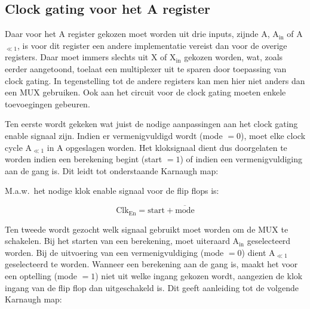 \subsection{Clock gating voor het A register}


Daar voor het A register gekozen moet worden uit drie  inputs, zijnde A, A$_{\text{in}}$ of A$_{\ll 1}$, is voor dit register een andere implementatie vereist dan voor de overige registers. Daar moet immers slechts uit X of X$_{\text{in}}$ gekozen worden, wat, zoals eerder aangetoond, toelaat een multiplexer uit te sparen door toepassing van clock gating. In tegenstelling tot de andere registers kan men hier niet anders dan een MUX gebruiken. Ook aan het circuit voor de clock gating moeten enkele toevoegingen gebeuren.

Ten eerste wordt gekeken wat juist de nodige aanpassingen aan het clock gating enable signaal zijn. Indien er vermenigvuldigd wordt (mode $= 0$), moet elke clock cycle A$_{\ll 1}$ in A opgeslagen worden. Het kloksignaal dient dus doorgelaten te worden indien een berekening begint (start $= 1$) of indien een vermenigvuldiging aan de gang is. Dit leidt tot onderstaande Karnaugh map:

\vspace{\textfloatsep}
\begin{minipage}{\linewidth}
	\begin{center}
	\end{center}
\end{minipage}
\vspace{\textfloatsep}

M.a.w.\ het nodige klok enable signaal voor de flip flops is:

\[ \text{Clk}_{\text{En}} = \text{start} + \overline{\text{mode}} \]

Ten tweede wordt gezocht welk signaal gebruikt moet worden om de MUX te schakelen. Bij het starten van een berekening, moet uiteraard A$_{\text{in}}$ geselecteerd worden. Bij de uitvoering van een vermenigvuldiging (mode $= 0$) dient A$_{\ll 1}$ geselecteerd te worden. Wanneer een berekening aan de gang is, maakt het voor een optelling (mode $= 1$) niet uit welke ingang gekozen wordt, aangezien de klok ingang van de flip flop dan uitgeschakeld is. Dit geeft aanleiding tot de volgende Karnaugh map:


